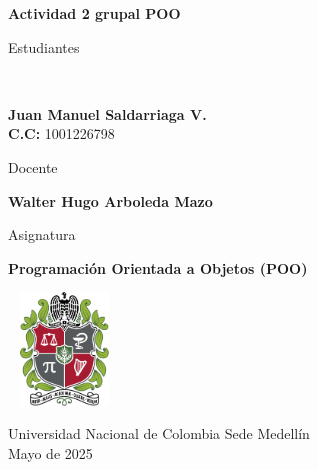 \begin{titlepage}
	\Large{
	\begin{center}
		\vspace*{1cm}
 
		\textbf{Actividad 2 grupal POO}
 
			 
		\vspace{1.5cm}
		
		Estudiantes
		
		\vspace{0.5cm}
		 \
 
		  \textbf{Juan Manuel Saldarriaga V.} \\
		  \textbf{C.C:} 1001226798 \\
		  
	 
 
	   \vspace{1cm}
		
		Docente 
		
		\vspace{0.5cm}
 
		\textbf{Walter Hugo Arboleda Mazo}
		\vspace{0.4cm}
		\vspace{1cm}
		
		Asignatura
		
		\vspace{0.5cm}
 
		\textbf{Programación Orientada a Objetos (POO)}
 
		\vfill
 
		\includegraphics[width=3cm,height=3cm]{logo.png}\\[0.2cm]
	  
		\vspace{0.2cm}
	  
				 
		Universidad Nacional de Colombia Sede Medellín\\
		Mayo de 2025
		
	\end{center}
	}
 \end{titlepage}